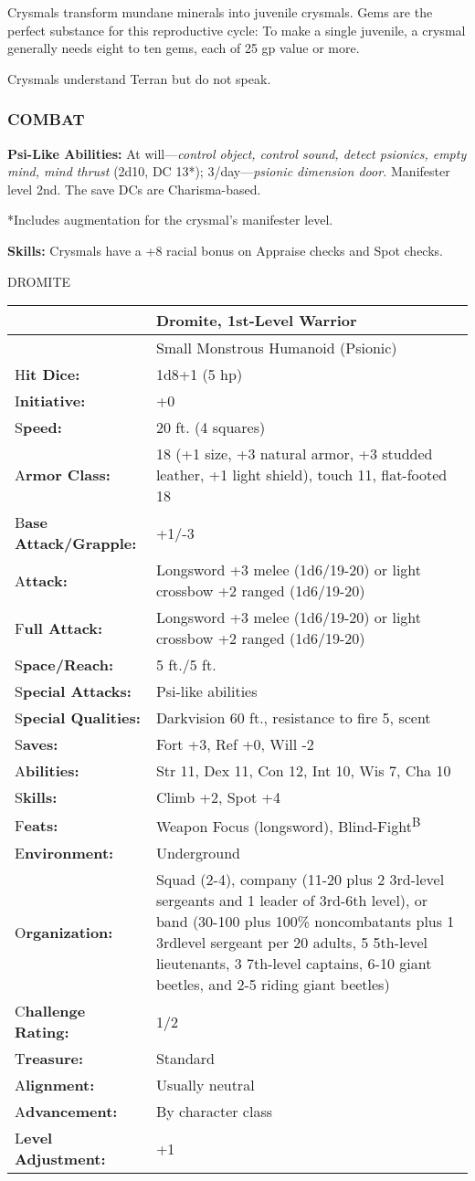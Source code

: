 \documentclass{article}
\begin{document}
Crysmals transform mundane minerals into juvenile crysmals. Gems are the perfect 
substance for this reproductive cycle: To make a single juvenile, a crysmal generally 
needs eight to ten gems, each of 25 gp value or more. 

Crysmals understand Terran but do not speak.

\subsubsection*{COMBAT}

\textbf{Psi-Like Abilities:} At will---\textit{control object, control sound, detect 
psionics, empty mind, mind thrust }(2d10, DC 13*); 3/day---\textit{psionic dimension 
door. }Manifester level 2nd. The save DCs are Charisma-based.

*Includes augmentation for the crysmal's manifester level.

\textbf{Skills: }Crysmals have a +8 racial bonus on Appraise checks and Spot checks.

\vspace{12pt}
{\LARGE{}DROMITE}

\begin{tabular}{|>{\raggedright}p{76pt}|>{\raggedright}p{250pt}|}
\hline
  & Dromite, 1st-Level Warrior\tabularnewline
\hline
  & Small Monstrous Humanoid (Psionic)\tabularnewline
\hline
H\textbf{it Dice:} & 1d8+1 (5 hp)\tabularnewline
\hline
I\textbf{nitiative:} & +0\tabularnewline
\hline
S\textbf{peed:} & 20 ft. (4 squares)\tabularnewline
\hline
A\textbf{rmor Class:} & 18 (+1 size, +3 natural armor, +3 studded leather, +1 light 
shield), touch 11, flat-footed 18\tabularnewline
\hline
B\textbf{ase Attack/Grapple:} & +1/-3\tabularnewline
\hline
A\textbf{ttack:} & Longsword +3 melee (1d6/19-20) or light crossbow +2 ranged (1d6/19-20)\tabularnewline
\hline
F\textbf{ull Attack:} & Longsword +3 melee (1d6/19-20) or light crossbow +2 ranged 
(1d6/19-20)\tabularnewline
\hline
S\textbf{pace/Reach:} & 5 ft./5 ft.\tabularnewline
\hline
S\textbf{pecial Attacks:} & Psi-like abilities\tabularnewline
\hline
S\textbf{pecial Qualities:} & Darkvision 60 ft., resistance to fire 5, scent\tabularnewline
\hline
S\textbf{aves:} & Fort +3, Ref +0, Will -2\tabularnewline
\hline
A\textbf{bilities:} & Str 11, Dex 11, Con 12, Int 10, Wis 7, Cha 10\tabularnewline
\hline
S\textbf{kills:} & Climb +2, Spot +4\tabularnewline
\hline
F\textbf{eats:} & Weapon Focus (longsword), Blind-Fight\textsuperscript{B}\tabularnewline
\hline
E\textbf{nvironment:} & Underground\tabularnewline
\hline
O\textbf{rganization:} & Squad (2-4), company (11-20 plus 2 3rd-level sergeants 
and 1 leader of 3rd-6th level), or band (30-100 plus 100\% noncombatants plus 1 
3rdlevel sergeant per 20 adults, 5 5th-level lieutenants, 3 7th-level captains, 
6-10 giant beetles, and 2-5 riding giant beetles)\tabularnewline
\hline
C\textbf{hallenge Rating:} & 1/2\tabularnewline
\hline
T\textbf{reasure:} & Standard\tabularnewline
\hline
A\textbf{lignment:} & Usually neutral\tabularnewline
\hline
A\textbf{dvancement:} & By character class\tabularnewline
\hline
L\textbf{evel Adjustment:} & +1\tabularnewline
\hline
\end{tabular}
\end{document}
